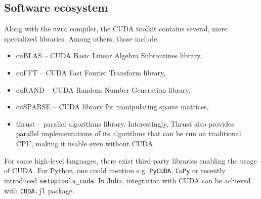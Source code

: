\subsection{Software ecosystem}
Along with the \texttt{nvcc} compiler, the CUDA toolkit contains several, more specialized libraries. Among others, those include:
\begin{itemize}
    \item cuBLAS -- CUDA Basic Linear Algebra Subroutines library,
    \item cuFFT -- CUDA Fast Fourier Transform library,
    \item cuRAND -- CUDA Random Number Generation library,
    \item cuSPARSE -- CUDA library for manipulating sparse matrices,
    \item thrust -- parallel algorithms library. Interestingly, Thrust also provides parallel
    implementations of its algorithms that can be run on traditional CPU, making it usable even
    without CUDA.
\end{itemize}

For some high-level languages, there exist third-party libraries enabling the usage of CUDA. For
Python, one could mention e.g. \texttt{PyCUDA}, \texttt{CuPy} or recently introduced
\texttt{setuptools\_cuda}. In Julia, integration with CUDA can be achieved with \texttt{CUDA.jl} package.



